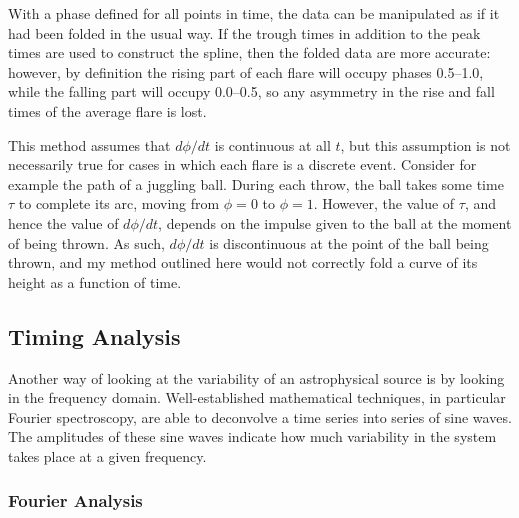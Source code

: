 \par With a phase defined for all points in time, the data can be manipulated as if it had been folded in the usual way.  If the trough times in addition to the peak times are used to construct the spline, then the folded data are more accurate: however, by definition the rising part of each flare will occupy phases 0.5--1.0, while the falling part will occupy 0.0--0.5, so any asymmetry in the rise and fall times of the average flare is lost.
\par This method assumes that $d\phi/dt$ is continuous at all $t$, but this assumption is not necessarily true for cases in which each flare is a discrete event.  Consider for example the path of a juggling ball.  During each throw, the ball takes some time $\tau$ to complete its arc, moving from $\phi=0$ to $\phi=1$.  However, the value of $\tau$, and hence the value of $d\phi/dt$, depends on the impulse given to the ball at the moment of being thrown.  As such, $d\phi/dt$ is discontinuous at the point of the ball being thrown, and my method outlined here would not correctly fold a curve of its height as a function of time.

\subsection{Timing Analysis}

\label{sec:fou}

\par Another way of looking at the variability of an astrophysical source is by looking in the frequency domain.  Well-established mathematical techniques, in particular Fourier spectroscopy, are able to deconvolve a time series into series of sine waves.  The amplitudes of these sine waves indicate how much variability in the system takes place at a given frequency.

\subsubsection{Fourier Analysis}

